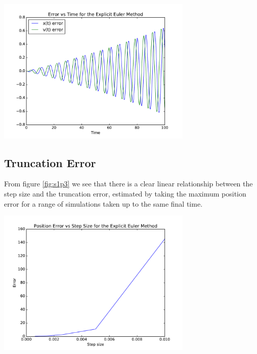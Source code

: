\documentclass{article}
\newenvironment{Figure}
  {\par\medskip\noindent\minipage{\linewidth}}
  {\endminipage\par\medskip}
\begin{document}
\begin{Figure}
\centering
\includegraphics[width=0.7\textwidth]{images/Sec1Plt2.pdf}
\label{fig:s1p2}
\end{Figure}


\subsection{Truncation Error}

From figure \ref{fig:s1p3} we see that there is a clear linear relationship between the step size and the truncation error, estimated by taking the maximum position error for a range of simulations taken up to the same final time.

\begin{Figure}
\centering
\includegraphics[width=0.7\textwidth]{images/Sec1Plt3.pdf}
\label{fig:s1p3}
\end{Figure}
\end{document}
